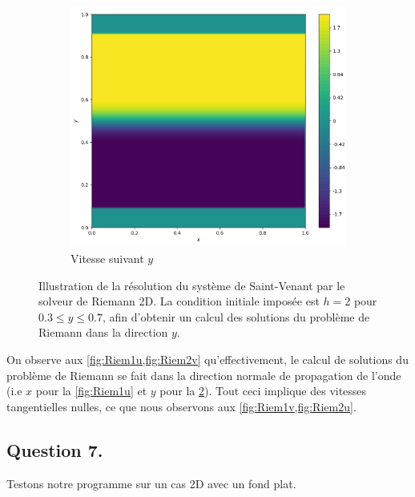 \documentclass[
	french,
	11pt, %
]{fphw}
\begin{document}
\begin{figure}[H]
\begin{subfigure}{0.32\textwidth}
		\label{fig:Riem2u}
	\end{subfigure}
	\begin{subfigure}{0.32\textwidth}
		\centering
		\includegraphics[width=\textwidth,height=0.85\textwidth]{Riem2v.png}
		\caption{Vitesse suivant $y$}
		\label{fig:Riem2v}
	\end{subfigure}
	\caption{Illustration de la résolution du système de Saint-Venant par le solveur de Riemann 2D. La condition initiale imposée est $ h = 2$ pour $ 0.3 \leq y \leq 0.7$, afin d'obtenir un calcul des solutions du problème de Riemann dans la direction $y$.}
	\label{fig:Riem2}
\end{figure}

\noindent On observe aux \cref{fig:Riem1u,fig:Riem2v} qu'effectivement, le calcul de solutions du problème de Riemann se fait dans la direction normale de propagation de l'onde (i.e $x$ pour la \cref{fig:Riem1u} et $y$ pour la \cref{fig:Riem2v}). Tout ceci implique des vitesses tangentielles nulles, ce que nous observons aux \cref{fig:Riem1v,fig:Riem2u}.


\subsection*{Question 7.}

\begin{problem}
	Testons notre programme sur un cas 2D avec un fond plat.
\end{problem}
\end{document}

